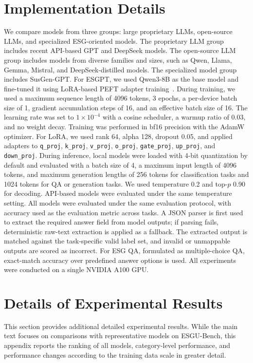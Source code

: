 \documentclass[11pt]{article}
\begin{document}
\section{Implementation Details}
\label{app:implementation}
We compare models from three groups: large proprietary LLMs, open-source LLMs, and specialized ESG-oriented models. 
The proprietary LLM group includes recent API-based GPT and DeepSeek models. 
The open-source LLM group includes models from diverse families and sizes, such as Qwen, Llama, Gemma, Mistral, and DeepSeek-distilled models. 
The specialized model group includes SusGen-GPT. 
For \textsf{ESGPT}, we used Qwen3-8B as the base model and fine-tuned it using LoRA-based PEFT adapter training~\cite{hu2022lora}. 
During training, we used a maximum sequence length of 4096 tokens, 3 epochs, a per-device batch size of 1, gradient accumulation steps of 16, and an effective batch size of 16. 
The learning rate was set to $1\times10^{-4}$ with a cosine scheduler, a warmup ratio of 0.03, and no weight decay. 
Training was performed in bf16 precision with the AdamW optimizer. 
For LoRA, we used rank 64, alpha 128, dropout 0.05, and applied adapters to \texttt{q\_proj}, \texttt{k\_proj}, \texttt{v\_proj}, \texttt{o\_proj}, \texttt{gate\_proj}, \texttt{up\_proj}, and \texttt{down\_proj}. 
During inference, local models were loaded with 4-bit quantization by default and evaluated with a batch size of 4, a maximum input length of 4096 tokens, and maximum generation lengths of 256 tokens for classification tasks and 1024 tokens for QA or generation tasks. We used temperature 0.2 and top-$p$ 0.90 for decoding. API-based models were evaluated under the same temperature setting. All models were evaluated under the same evaluation protocol, with accuracy used as the evaluation metric across tasks. A JSON parser is first used to extract the required answer field from model outputs; if parsing fails, deterministic raw-text extraction is applied as a fallback. The extracted output is matched against the task-specific valid label set, and invalid or unmappable outputs are scored as incorrect. For ESG QA, formulated as multiple-choice QA, exact-match accuracy over predefined answer options is used. All experiments were conducted on a single NVIDIA A100 GPU. 

\section{Details of Experimental Results}
\label{app:additional_results}
This section provides additional detailed experimental results. While the main text focuses on comparisons with representative models on \textsf{ESGU-Bench}, this appendix reports the ranking of all models, category-level performance, and performance changes according to the training data scale in greater detail.
\end{document}
